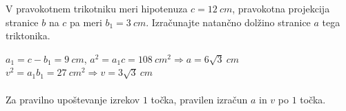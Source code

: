 \documentclass[addpoints]{exam}
\begin{document}
\begin{questions}

    \question[3]
    V pravokotnem trikotniku meri hipotenuza $c=12~cm$, pravokotna projekcija stranice $b$ na $c$ pa meri $b_1=3~cm$.
        Izračunajte natančno dolžino stranice $a$ tega triktonika. %

        \begin{solution}[11cm]
            $a_1=c-b_1=9~cm$, $a^2=a_1c=108~cm^2 \Rightarrow a=6\sqrt{3}~cm$ \\
            $v^2=a_1b_1=27~cm^2 \Rightarrow v=3\sqrt{3}~cm$ \\ \\
            Za pravilno upoštevanje izrekov $1$ točka, pravilen izračun $a$ in $v$ po $1$ točka.
        \end{solution}
















\end{questions}
\end{document}
